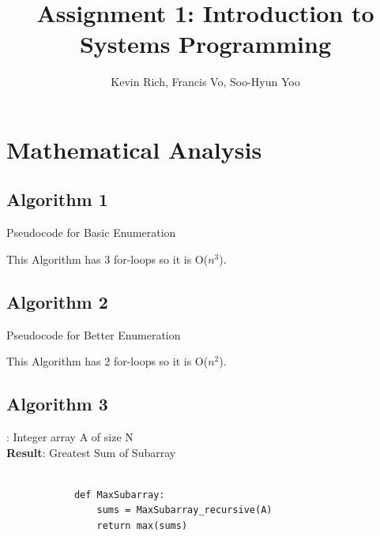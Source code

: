 \documentclass[a4paper,10pt]{article}
\title{Assignment 1: Introduction to Systems Programming}
\author{Kevin Rich, Francis Vo, Soo-Hyun Yoo}
\begin{document}
	\maketitle

	\section{Mathematical Analysis}
		\subsection{Algorithm 1}
			\begin{algorithm}[H]
				\SetAlgoLined
				\LinesNumbered
				\DontPrintSemicolon
			\caption{Pseudocode for Basic Enumeration}
			\end{algorithm}
			This Algorithm has 3 for-loops so it is O($n^3$).

		\subsection{Algorithm 2}
			\begin{algorithm}[H]
				\SetAlgoLined
				\LinesNumbered
				\DontPrintSemicolon
			\caption{Pseudocode for Better Enumeration}
			\end{algorithm}
			This Algorithm has 2 for-loops so it is O($n^2$).

		\subsection{Algorithm 3}
			: Integer array A of size N \\
			{\bf Result}: Greatest Sum of Subarray

			\begin{minipage}[!h]{6in}
			\begin{verbatim}

			def MaxSubarray:
			    sums = MaxSubarray_recursive(A)
			    return max(sums)
			\end{verbatim}
			\end{minipage}
\end{document}
